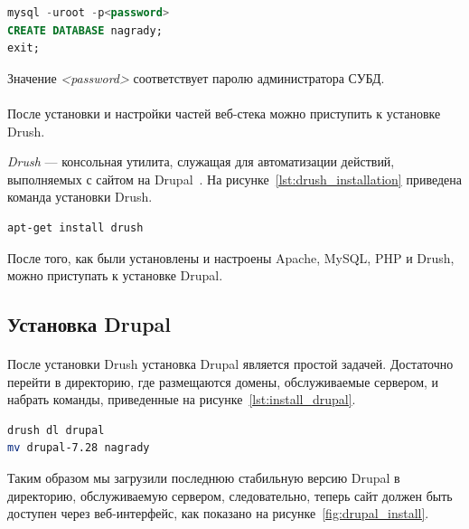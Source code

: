 \begin{lstlisting}[language=SQL,alsolanguage=bash,
  caption=Создание базы данных в СУБД MySQL,
  label=lst:mysql_create_db]
mysql -uroot -p<password>
CREATE DATABASE nagrady;
exit;
\end{lstlisting}

Значение \textit{<password>} соответствует паролю администратора СУБД.

\paragraph{}
После установки и настройки частей веб-стека можно
приступить к установке Drush.

\textit{Drush} --- консольная утилита, служащая для автоматизации действий,
выполняемых с сайтом на Drupal~\cite{drush_about}.
На рисунке~\ref{lst:drush_installation} приведена команда установки Drush.

\begin{lstlisting}[language=bash,
  caption=Команда установки Drush,
  label=lst:drush_installation]
apt-get install drush
\end{lstlisting}

После того, как были установлены и настроены Apache, MySQL, PHP и Drush,
можно приступать к установке Drupal.

\subsection{Установка Drupal}
\label{ssec:drupal_installation}

\paragraph{}
После установки Drush установка Drupal является простой задачей.
Достаточно перейти в директорию, где размещаются домены, обслуживаемые сервером,
и набрать команды, приведенные на рисунке~\ref{lst:install_drupal}.

\begin{lstlisting}[language=bash,
  caption=Установки Drupal с помощью Drush,
  label=lst:install_drupal]
drush dl drupal
mv drupal-7.28 nagrady
\end{lstlisting}

Таким образом мы загрузили последнюю стабильную версию Drupal в директорию,
обслуживаемую сервером, следовательно, теперь сайт должен быть доступен через
веб-интерфейс, как показано на рисунке~\ref{fig:drupal_install}.


